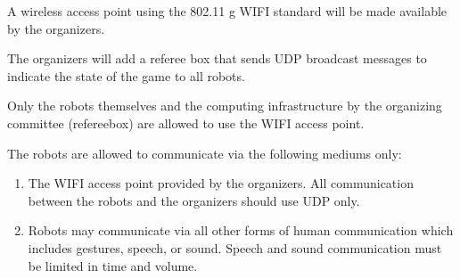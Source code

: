 \documentclass[12pt]{hurocup}
\begin{document}
\label{law:communication}

\begin{lawlist}[US]

\item A wireless access point using the 802.11 g WIFI standard will be
  made available by the organizers.

\item The organizers will add a referee box that sends UDP broadcast
  messages to indicate the state of the game to all robots.

\item Only the robots themselves and the computing infrastructure by
  the organizing committee (refereebox) are allowed to use the WIFI
  access point.

\item The robots are allowed to communicate via the following mediums
  only:
  \begin{enumerate}
  \item The WIFI access point provided by the organizers. All
    communication between the robots and the organizers should use
    UDP only.
  \item Robots may communicate via all other forms of human
    communication which includes gestures, speech, or sound. Speech
    and sound communication must be limited in time and volume.
  \end{enumerate}

\end{lawlist}

\label{law:gameplay}
\end{document}

